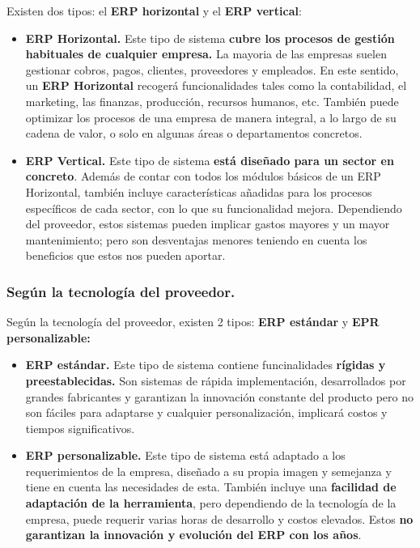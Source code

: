 \documentclass[
]{article}
\begin{document}
Existen dos tipos: el \textbf{ERP horizontal} y el \textbf{ERP
vertical}:

\begin{itemize}
\item
  \textbf{ERP Horizontal.} Este tipo de sistema \textbf{cubre los
  procesos de gestión habituales de cualquier empresa.} La mayoria de
  las empresas suelen gestionar cobros, pagos, clientes, proveedores y
  empleados. En este sentido, un \textbf{ERP Horizontal} recogerá
  funcionalidades tales como la contabilidad, el marketing, las
  finanzas, producción, recursos humanos, etc. También puede optimizar
  los procesos de una empresa de manera integral, a lo largo de su
  cadena de valor, o solo en algunas áreas o departamentos concretos.
\item
  \textbf{ERP Vertical.} Este tipo de sistema \textbf{está diseñado para
  un sector en concreto}. Además de contar con todos los módulos básicos
  de un ERP Horizontal, también incluye características añadidas para
  los procesos específicos de cada sector, con lo que su funcionalidad
  mejora. Dependiendo del proveedor, estos sistemas pueden implicar
  gastos mayores y un mayor mantenimiento; pero son desventajas menores
  teniendo en cuenta los beneficios que estos nos pueden aportar.
\end{itemize}

\hypertarget{seguxfan-la-tecnologuxeda-del-proveedor.}{%
\subsubsection{Según la tecnología del
proveedor.}\label{seguxfan-la-tecnologuxeda-del-proveedor.}}

Según la tecnología del proveedor, existen 2 tipos: \textbf{ERP
estándar} y \textbf{EPR personalizable:}

\begin{itemize}
\item
  \textbf{ERP estándar.} Este tipo de sistema contiene funcinalidades
  \textbf{rígidas y preestablecidas.} Son sistemas de rápida
  implementación, desarrollados por grandes fabricantes y garantizan la
  innovación constante del producto pero no son fáciles para adaptarse y
  cualquier personalización, implicará costos y tiempos significativos.
\item
  \textbf{ERP personalizable.} Este tipo de sistema está adaptado a los
  requerimientos de la empresa, diseñado a su propia imagen y semejanza
  y tiene en cuenta las necesidades de esta. También incluye una
  \textbf{facilidad de adaptación de la herramienta}, pero dependiendo
  de la tecnología de la empresa, puede requerir varias horas de
  desarrollo y costos elevados. Estos \textbf{no garantizan la
  innovación y evolución del ERP con los años}.
\end{itemize}
\end{document}
